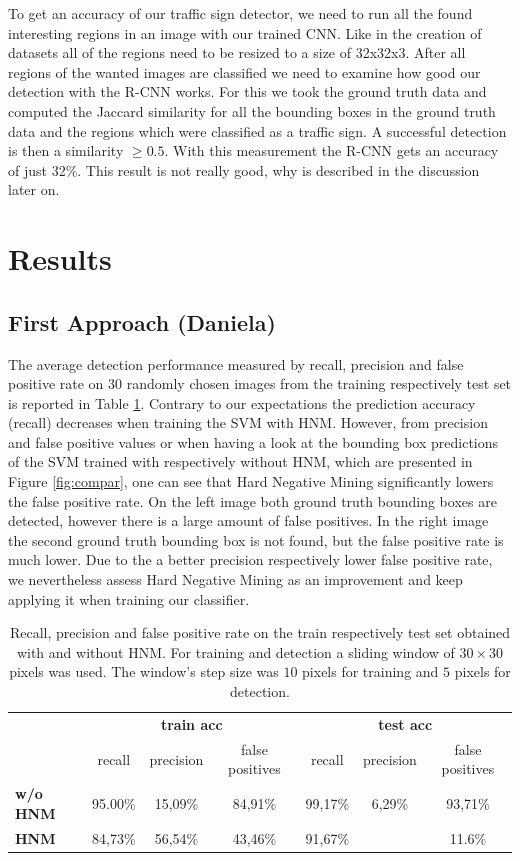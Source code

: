 \documentclass[12pt,a4paper,bibliography=totocnumbered,listof=totocnumbered]{scrartcl}
\begin{document}
To get an accuracy of our traffic sign detector, we need to run all the found interesting regions in an image with our trained CNN. Like in the creation of datasets all of the regions need to be resized to a size of 32x32x3. After all regions of the wanted images are classified we need to examine how good our detection with the R-CNN works. For this we took the ground truth data and computed the Jaccard similarity for all the bounding boxes in the ground truth data and the regions which were classified as a traffic sign. A successful detection is then a similarity $\geq 0.5$. With this measurement the R-CNN gets an accuracy of just 32\%. This result is not really good, why is described in the discussion later on.

\pagebreak
\section{Results}
\subsection{First Approach \small{(Daniela)}}

The average detection performance measured by recall, precision and false positive rate on 30 randomly chosen images from the training respectively test set is reported in Table \ref{tab:perf}. Contrary to our expectations the prediction accuracy (recall) decreases when training the SVM with HNM. However, from precision and false positive values or when having a look at the bounding box predictions of the SVM trained with respectively without HNM, which are presented in Figure \ref{fig:compar}, one can see that Hard Negative Mining significantly lowers the false positive rate. On the left image both ground truth bounding boxes are detected, however there is a large amount of false positives. In the right image the second ground truth bounding box is not found, but the false positive rate is much lower. Due to the a better precision respectively lower false positive rate, we nevertheless assess Hard Negative Mining as an improvement and keep applying it when training our classifier.

\begin{table}[H]
\centering
\caption{Recall, precision and false positive rate on the train respectively test set obtained with and without HNM. For training and detection a sliding window of $30 \times 30$ pixels was used. The window's step size was $10$ pixels for training and $5$ pixels for detection.}
\small
  \begin{tabular}{l | c c c c c c}
  	  & 
      \multicolumn{3}{c}{\textbf{train acc}} &
      \multicolumn{3}{c}{\textbf{test acc}} \\
    & recall & precision & false positives & recall & precision & false positives \\ \toprule
    \textbf{w/o HNM} & 95.00\% & 15,09\% & 84,91\% & 99,17\% &6,29\% & 93,71\% \\
    \textbf{HNM}  & 84,73\% & 56,54\% & 43,46\% & 91,67\% & & 11.6\% \\
  \end{tabular}
  \label{tab:perf}
\end{table}
\end{document}
